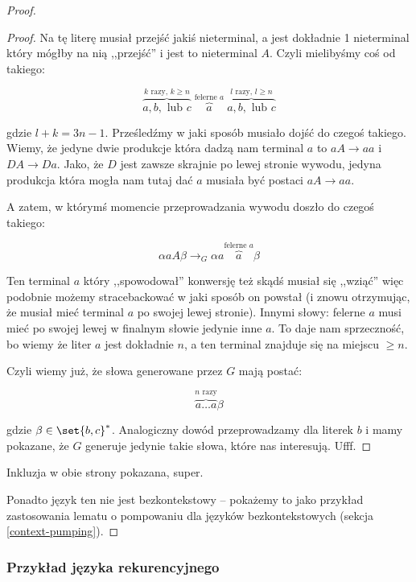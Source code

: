 \begin{proof}
\begin{proof}
		Na tę literę musiał przejść jakiś nieterminal, a jest dokładnie 1 nieterminal który mógłby na nią ,,przejść'' i jest to nieterminal \(A\). Czyli mielibyśmy coś od takiego:

		\[
			\overbrace{a, b, \text{ lub } c}^{\text{\(k\) razy, \(k \geq n\)}} \; \overbrace{a}^{\text{felerne \(a\)}} \; \overbrace{a, b, \text{ lub } c}^{\text{\(l\) razy, \(l \geq n\)}}
		\]

		gdzie \( l + k = 3n - 1\). Prześledźmy w jaki sposób musiało dojść do czegoś takiego. Wiemy, że jedyne dwie produkcje która dadzą nam terminal \(a\) to \(aA \rightarrow aa\) i \(DA \rightarrow Da\). Jako, że \(D\) jest zawsze skrajnie po lewej stronie wywodu, jedyna produkcja która mogła nam tutaj dać \(a\) musiała być postaci \(aA \rightarrow aa\).

		A zatem, w którymś momencie przeprowadzania wywodu doszło do czegoś takiego:

		\[
			\alpha a A \beta \rightarrow_G \alpha a \overbrace{a}^{\text{felerne \(a\)}} \beta
		\]

		Ten terminal \(a\) który ,,spowodował'' konwersję też skądś musiał się ,,wziąć'' więc podobnie możemy stracebackować w jaki sposób on powstał (i znowu otrzymując, że musiał mieć terminal \(a\) po swojej lewej stronie). Innymi słowy: felerne \(a\) musi mieć po swojej lewej w finalnym słowie jedynie inne \(a\). To daje nam sprzeczność, bo wiemy że liter \(a\) jest dokładnie \(n\), a ten terminal znajduje się na miejscu \(\geq n\).

		Czyli wiemy już, że słowa generowane przez \(G\) mają postać:

		\[
			\overbrace{a \dots a}^{\text{\(n\) razy}} \beta
		\]

		gdzie \(\beta \in \set{b, c}^*\). Analogiczny dowód przeprowadzamy dla literek \(b\) i mamy pokazane, że \(G\) generuje jedynie takie słowa, które nas interesują. Ufff.
	\end{proof}

	Inkluzja w obie strony pokazana, super.

	Ponadto język ten nie jest bezkontekstowy -- pokażemy to jako przykład zastosowania lematu o pompowaniu dla języków bezkontekstowych (sekcja \ref{context-pumping}).
\end{proof}

\subsubsection{Przykład języka rekurencyjnego}
\label{recursive-example}

